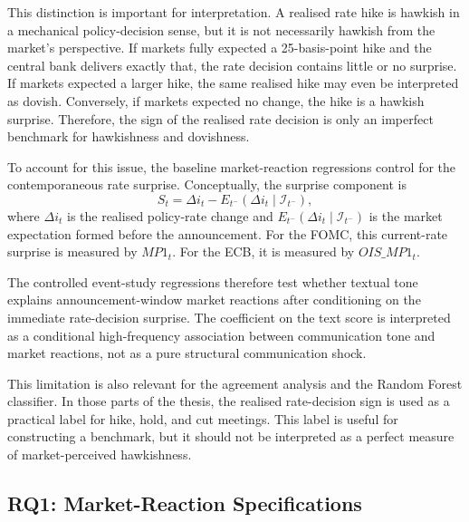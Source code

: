 This distinction is important for interpretation. A realised rate hike is
hawkish in a mechanical policy-decision sense, but it is not necessarily
hawkish from the market's perspective. If markets fully expected a
25-basis-point hike and the central bank delivers exactly that, the rate
decision contains little or no surprise. If markets expected a larger
hike, the same realised hike may even be interpreted as dovish. Conversely,
if markets expected no change, the hike is a hawkish surprise. Therefore,
the sign of the realised rate decision is only an imperfect benchmark for
hawkishness and dovishness.

To account for this issue, the baseline market-reaction regressions
control for the contemporaneous rate surprise. Conceptually, the surprise
component is
%
\begin{equation}
\label{eq:rate_surprise}
S_t =
\Delta i_t -
E_{t^-}\!\left(\Delta i_t \mid \mathcal{I}_{t^-}\right),
\end{equation}
%
where \(\Delta i_t\) is the realised policy-rate change and
\(E_{t^-}(\Delta i_t \mid \mathcal{I}_{t^-})\) is the market expectation
formed before the announcement. For the FOMC, this current-rate surprise
is measured by \(MP1_t\). For the ECB, it is measured by \(OIS\_MP1_t\).

The controlled event-study regressions therefore test whether textual
tone explains announcement-window market reactions after conditioning on
the immediate rate-decision surprise. The coefficient on the text score is
interpreted as a conditional high-frequency association between
communication tone and market reactions, not as a pure structural
communication shock.

This limitation is also relevant for the agreement analysis and the
Random Forest classifier. In those parts of the thesis, the realised
rate-decision sign is used as a practical label for hike, hold, and cut
meetings. This label is useful for constructing a benchmark, but it should
not be interpreted as a perfect measure of market-perceived hawkishness.


\subsection{RQ1: Market-Reaction Specifications}
\label{sec:meth_rq1}
\label{sec:meth_expected_signs}
\label{sec:meth_fwd_reg}
\label{sec:meth_dm_decomposition}
\label{sec:meth_rf_reg}
\label{sec:meth_horserace}
\label{sec:meth_fe}


